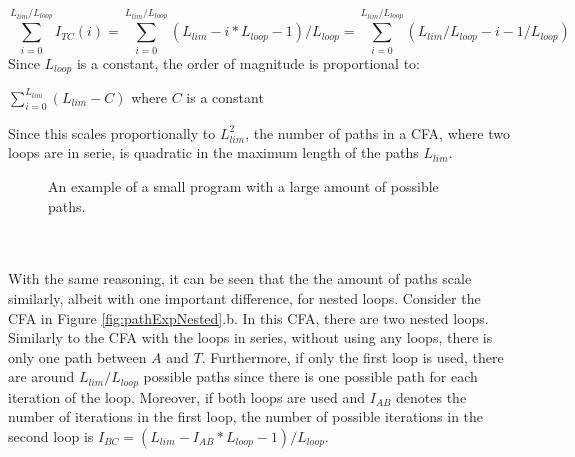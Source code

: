 \documentclass{kththesis}
\begin{document}
\begin{equation*}
\sum^{L_{lim}/L_{loop}}_{i = 0}I_{TC}(i) = \sum^{L_{lim}/L_{loop}}_{i = 0}(L_{lim}-i*L_{loop}-1)/L_{loop} = \sum^{L_{lim}/L_{loop}}_{i = 0}(L_{lim}/L_{loop}-i-1/L_{loop})  
\end{equation*}
Since $L_{loop}$ is a constant, the order of magnitude is proportional to:
\begin{center}
$\sum^{L_{lim}}_{i = 0}(L_{lim} - C)$ where $C$ is a constant
\end{center}
Since this scales proportionally to $L_{lim}^2$, the number of paths in a CFA, where two loops are in serie, is quadratic in the maximum length of the paths $L_{lim}$. %
\begin{figure}[!t]
    \centering
{}
\caption{An example of a small program with a large amount of possible paths.}
    \label{fig:pathExpProg}
\end{figure}
\\ \\
With the same reasoning, it can be seen that the the amount of paths scale similarly, albeit with one important difference, for nested loops. Consider the CFA in Figure \ref{fig:pathExpNested}.b. In this CFA, there are two nested loops. Similarly to the CFA with the loops in series, without using any loops, there is only one path between $A$ and $T$. Furthermore, if only the first loop is used, there are around $L_{lim}/L_{loop}$ possible paths since there is one possible path for each iteration of the loop. Moreover, if both loops are used and $I_{AB}$ denotes the number of iterations in the first loop, the number of possible iterations in the second loop is $I_{BC} = (L_{lim}-I_{AB}*L_{loop}-1)/L_{loop}$. 
\end{document}
